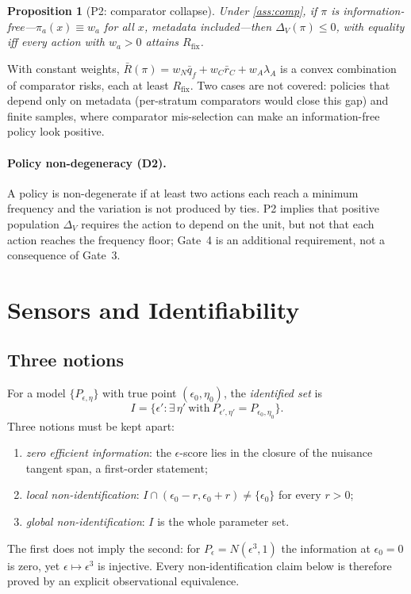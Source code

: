 \documentclass[10pt,twocolumn]{article}
\newtheorem{proposition}[theorem]{Proposition}
\theoremstyle{definition}
\theoremstyle{remark}
\newcommand{\eps}{\epsilon}
\newcommand{\lA}{\lambda_A}
\newcommand{\DV}{\Delta_V}
\begin{document}
\begin{proposition}[P2: comparator collapse]\label{prop:P2}
Under \cref{ass:comp}, if $\pi$ is information-free---$\pi_a(x)\equiv w_a$ for all $x$, metadata included---then $\DV(\pi)\le0$, with equality iff every action with $w_a>0$ attains $R_{\mathrm{fix}}$.
\end{proposition}
With constant weights, $\bar R(\pi)=w_N\bar q_f+w_C\bar r_C+w_A\lA$ is a convex combination of comparator risks, each at least $R_{\mathrm{fix}}$. Two cases are not covered: policies that depend only on metadata (per-stratum comparators would close this gap) and finite samples, where comparator mis-selection can make an information-free policy look positive.

\paragraph{Policy non-degeneracy (D2).} A policy is non-degenerate if at least two actions each reach a minimum frequency and the variation is not produced by ties. P2 implies that positive population $\DV$ requires the action to depend on the unit, but not that each action reaches the frequency floor; Gate~4 is an additional requirement, not a consequence of Gate~3.

\section{Sensors and Identifiability}\label{sec:ident}

\subsection{Three notions}
For a model $\{P_{\eps,\eta}\}$ with true point $(\eps_0,\eta_0)$, the \emph{identified set} is
\[
I=\bigl\{\eps' : \exists\,\eta'\ \text{with}\ P_{\eps',\eta'}=P_{\eps_0,\eta_0}\bigr\}.
\]
Three notions must be kept apart:
\begin{enumerate}[label=(\roman*)]
\item \emph{zero efficient information}: the $\eps$-score lies in the closure of the nuisance tangent span, a first-order statement;
\item \emph{local non-identification}: $I\cap(\eps_0-r,\eps_0+r)\neq\{\eps_0\}$ for every $r>0$;
\item \emph{global non-identification}: $I$ is the whole parameter set.
\end{enumerate}
The first does not imply the second: for $P_\eps=N(\eps^3,1)$ the information at $\eps_0=0$ is zero, yet $\eps\mapsto\eps^3$ is injective. Every non-identification claim below is therefore proved by an explicit observational equivalence.
\end{document}
